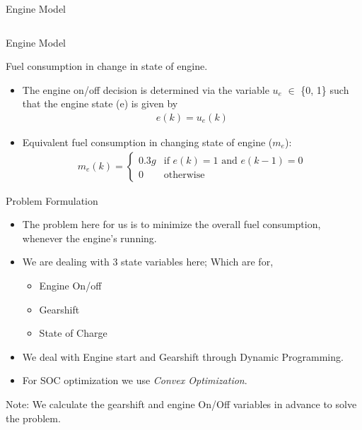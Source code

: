 \documentclass{beamer}
\begin{document}
\begin{frame}{Engine Model}
\begin{columns}
\end{columns}
\end{frame}

\begin{frame}{Engine Model}
\begin{block}{ }
    Fuel consumption in change in state of engine.
\end{block}

\begin{itemize}
    \item The engine on/off decision is determined via the variable $u_e$ $\in$ \{0, 1\} such that the engine state (e) is
given by \\
\begin{align*}
    e(k) = u_{e}(k)
\end{align*}

    \item   Equivalent fuel consumption in changing state of engine ($m_e$): \\ \begin{align*}
    m_e(k)= \begin{cases}
    0.3 g & \text{if } e(k) = 1 \text{ and } e(k-1) = 0\\
    0              & \text{otherwise}
\end{cases}
    \end{align*}
    
\end{itemize}
\end{frame}




\begin{frame}{Problem Formulation}
\begin{itemize}
    \item The problem here for us is to minimize the overall fuel consumption, whenever the engine's running.
    \item We are dealing with 3 state variables here; Which are for,
    \begin{itemize}
        \item Engine On/off
        \item Gearshift
        \item State of Charge
    \end{itemize}
    \item We deal with Engine start and Gearshift through Dynamic Programming.
    \item For SOC optimization we use \emph{Convex Optimization}.
    
\end{itemize}
Note: We calculate the gearshift and engine On/Off variables in advance to solve the problem.  
\end{frame}
\end{document}
